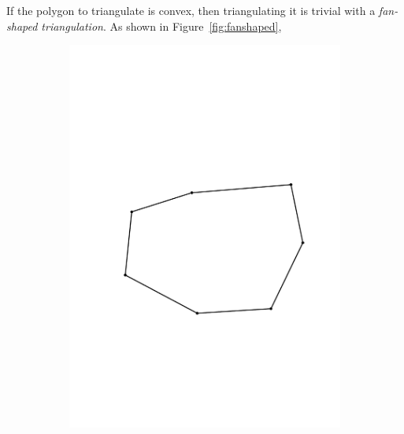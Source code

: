 If the polygon to triangulate is convex, then triangulating it is trivial with a \emph{fan-shaped triangulation}.
As shown in Figure~\ref{fig:fanshaped},
\begin{figure}
  \centering
  \begin{subfigure}[b]{0.35\linewidth}
    \centering
    \includegraphics[page=1,width=\textwidth]{figs/fanshaped}
    \caption{}
  \end{subfigure}%
  \qquad
  \begin{subfigure}[b]{0.35\linewidth}
    \centering

\end{subfigure}
\end{figure}
